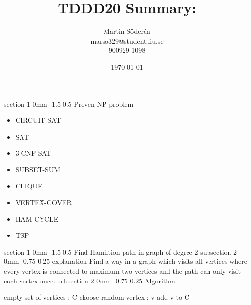 \documentclass[a4paper,11pt]{article}
\makeatletter
\renewcommand{\section}{\@startsection
   {section}%
   {1}%
   {0mm}%
   {-1.5\baselineskip}%
   {0.5\baselineskip}%
   {\sffamily\bfseries\upshape\normalsize}}%
\renewcommand{\subsection}{\@startsection
   {subsection}%
   {2}%
   {0mm}%
   {-0.75\baselineskip}%
   {0.25\baselineskip}%
   {\rmfamily\normalfont\slshape\normalsize}}%
\makeatother
\begin{document}
\begin{titlepage}
\title{TDDD20 Summary:}
\author{Martin Söderén\\ marso329@student.liu.se\\900929-1098}
\date{\today}
\maketitle
\vfill %
\thispagestyle{empty}
\end{titlepage}
\section{Proven NP-problem}
\begin{itemize}
\item CIRCUIT-SAT
\item SAT
\item 3-CNF-SAT
\item SUBSET-SUM
\item CLIQUE
\item VERTEX-COVER
\item HAM-CYCLE
\item TSP 
\end{itemize}

\section{Find Hamiltion path in graph of degree 2}
\subsection{explanation}
Find a way in a graph which visits all vertices where every vertex is connected to maximum two vertices and the path can only visit each vertex once.
\subsection{Algorithm}
\begin{algorithm}
 empty 	set of vertices : C \;
  choose random vertex : v \;
  add v to C\;
 \caption{Find Hamiltion path in graph of degree 2}
\end{algorithm}
\end{document}
